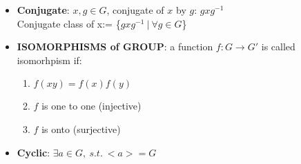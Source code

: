 \documentclass[12pt]{article}
\begin{document}
\begin{enumerate}
\begin{itemize}
            \item \textbf{Conjugate}: $x,g\in G$, conjugate of $x$ by $g$: $gxg^{-1}$\\
            Conjugate class of x:= \{$gxg^{-1} \ | \ \forall g \in G$\}
            \item \textbf{ISOMORPHISMS of GROUP}: a function $f : G \rightarrow G'$ is called isomorhpism if:
            \begin{enumerate}
                \item $f(xy) = f(x)f(y)$
                \item $f$ is one to one (injective)
                \item $f$ is onto (surjective)
            \end{enumerate}
            \item \textbf{Cyclic}: $\exists a \in G, \ s.t. \ <a> = G$
        \end{itemize}
    \end{enumerate}
\end{document}
